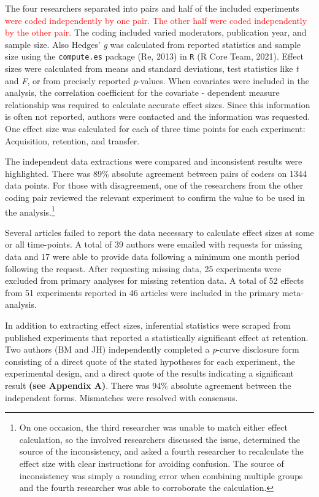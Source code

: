\documentclass[
  english,
  man,floatsintext]{apa7}
\begin{document}
The four researchers separated into pairs and half of the included experiments \textcolor{red}{were coded independently by one pair. The other half were coded independently by the other pair.} The coding included varied moderators, publication year, and sample size. Also Hedges' \emph{g} was calculated from reported statistics and sample size using the \texttt{compute.es} package (Re, 2013) in \texttt{R} (R Core Team, 2021). Effect sizes were calculated from means and standard deviations, test statistics like \emph{t} and \emph{F}, or from precisely reported \emph{p}-values. When covariates were included in the analysis, the correlation coefficient for the covariate - dependent measure relationship was required to calculate accurate effect sizes. Since this information is often not reported, authors were contacted and the information was requested. One effect size was calculated for each of three time points for each experiment: Acquisition, retention, and transfer.

The independent data extractions were compared and inconsistent results were highlighted. There was 89\% absolute agreement between pairs of coders on 1344 data points. For those with disagreement, one of the researchers from the other coding pair reviewed the relevant experiment to confirm the value to be used in the analysis.\footnote{On one occasion, the third researcher was unable to match either effect calculation, so the involved researchers discussed the issue, determined the source of the inconsistency, and asked a fourth researcher to recalculate the effect size with clear instructions for avoiding confusion. The source of inconsistency was simply a rounding error when combining multiple groups and the fourth researcher was able to corroborate the calculation.}

Several articles failed to report the data necessary to calculate effect sizes at some or all time-points. A total of 39 authors were emailed with requests for missing data and 17 were able to provide data following a minimum one month period following the request. After requesting missing data, 25 experiments were excluded from primary analyses for missing retention data. A total of 52 effects from 51 experiments reported in 46 articles were included in the primary meta-analysis.

In addition to extracting effect sizes, inferential statistics were scraped from published experiments that reported a statistically significant effect at retention. Two authors (BM and JH) independently completed a \emph{p}-curve disclosure form consisting of a direct quote of the stated hypotheses for each experiment, the experimental design, and a direct quote of the results indicating a significant result \textbf{(see Appendix A)}. There was 94\% absolute agreement between the independent forms. Mismatches were resolved with consensus.
\end{document}
